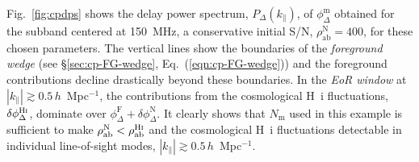 \documentclass[
reprint,
superscriptaddress,
amsmath,
amssymb,
aps,
prd
]{revtex4-1}
\begin{document}
Fig.~\ref{fig:cpdps} shows the delay power spectrum, $P_\Delta(k_\parallel)$, of $\phi_\Delta^\textrm{m}$ obtained for the subband centered at 150~MHz, a conservative initial S/N, $\rho_\textrm{ab}^\textrm{N}=400$,  for these chosen parameters. The vertical lines show the boundaries of the {\it foreground wedge} (see \S\ref{sec:cp-FG-wedge}, Eq.~(\ref{eqn:cp-FG-wedge})) and the foreground contributions decline drastically beyond these boundaries. In the {\it EoR window} at $|k_\parallel| \gtrsim 0.5\,h$~Mpc$^{-1}$, the contributions from the cosmological H~{\sc i} fluctuations, $\delta\phi_\Delta^\textrm{H{\sc i}}$, dominate over $\phi_\Delta^\textrm{F} + \delta\phi_\Delta^\textrm{N}$. It clearly shows that $N_\textrm{m}$ used in this example is sufficient to make $\rho_\textrm{ab}^\textrm{N} < \rho_\textrm{ab}^\textrm{H{\sc i}}$ and the cosmological H~{\sc i} fluctuations detectable in individual line-of-sight modes, $|k_\parallel| \gtrsim 0.5\,h$~Mpc$^{-1}$. 
\end{document}
